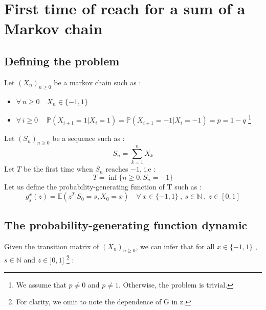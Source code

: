\documentclass{article}
\begin{document}
\section{First time of reach for a sum of a Markov chain}

\subsection{Defining the problem}

Let $(X_{n})_{n\geq0}$ be a markov chain such as :
\begin{itemize}
\item $\forall \, n\geq0 \quad X_{n} \in \{-1,1\} $ 
\item $\forall \, i\geq0 \quad\ \mathbb{P}( X_{i+1}=1 | X_{i}=1 ) = \mathbb{P}( X_{i+1}=-1 | X_{i}=-1 ) = p = 1-q$ \footnote{We assume that $p \ne 0$ and $p \ne 1$. Otherwise, the problem is trivial.}
\end{itemize}
Let $(S_{n})_{n\geq0}$ be a sequence such as :
$$ S_{n} = \sum_{k=1}^{n}X_{k} $$
Let $T$ be the first time when $S_{n}$ reaches $-1$, i.e  :
$$ T= \inf \{ n\geq0 , S_{n}=-1   \} $$
Let us define the  probability-generating function of T such as :
$$ g_{s}^{x}(z) = \mathbb{E}(z^{T} | S_{0}=s, X_{0}=x) \quad \forall \ x \in \{-1,1\} \ , \ s \in \mathbb{N} \ , \ z \in [0,1]  $$

\subsection{The probability-generating function dynamic}
Given the transition matrix of $(X_{n})_{n\geq0}$, we can infer that for all $x \in \{-1,1\}$ , $s \in \mathbb{N}$ and $z \in ]0,1]$ \footnote{For clarity, we omit to note the dependence of G in z.} :
\end{document}

